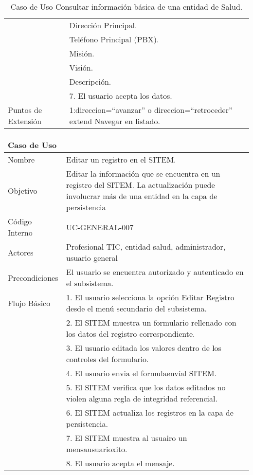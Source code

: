 \begin{table}
\begin{center}
\begin{tabular}{|l|p{10cm}|}
&Dirección Principal.\\
&Teléfono Principal (PBX).\\
&Misión.\\
&Visión.\\
&Descripción.\\
& 7. El usuario acepta los datos.\\
\hline
Puntos de Extensión & 1:direccion=“avanzar” o direccion=“retroceder” extend Navegar en listado. \\
\hline
\end{tabular}
\caption{Caso de Uso Consultar información básica de una entidad de Salud.}
\label{casouso6} 
\end{center}
\end{table}

\begin{table}
\begin{center}
\begin{tabular}{|l|p{10cm}|}
\hline
\textbf{Caso de Uso}&\\
\hline
Nombre & Editar un registro en el SITEM.\\
\hline
Objetivo & Editar la información que se encuentra en un registro del SITEM. La actualización puede involucrar más de una entidad en la capa de persistencia\\
\hline
Código Interno & UC-GENERAL-007\\
\hline
Actores & Profesional TIC, entidad salud, administrador, usuario general\\
\hline
Precondiciones & El usuario se encuentra autorizado y autenticado en el subsistema.\\
\hline
Flujo Básico & 1. El usuario selecciona la opción Editar Registro desde el menú secundario del subsistema.\\
& 2. El SITEM muestra un formulario rellenado con los datos del registro correspondiente.\\
& 3. El usuario editada los valores dentro de los controles del formulario.\\
& 4. El usuario envia el formulaenvíal SITEM.\\
& 5. El SITEM verifica que los datos editados no violen alguna regla de integridad referencial.\\
& 6. El SITEM actualiza los registros en la capa de persistencia.\\
& 7. El SITEM muestra al usuairo un mensausuarioxito.\\
& 8. El usuario acepta el mensaje.\\

\end{tabular}
\end{center}
\end{table}
